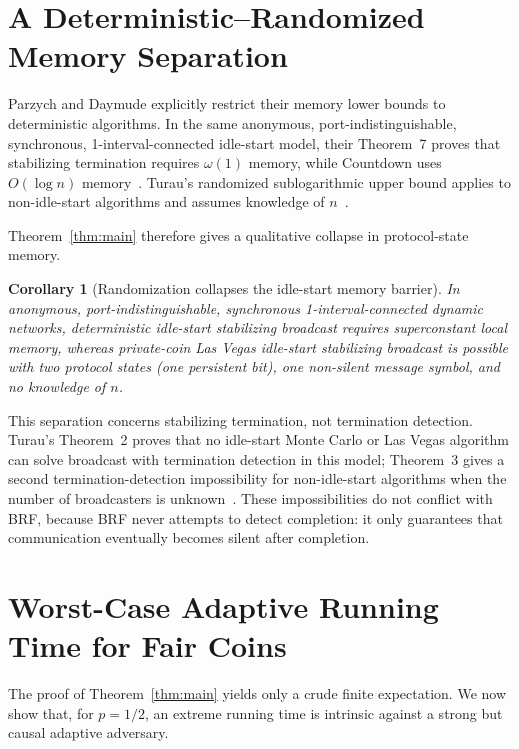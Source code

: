 \documentclass[11pt]{article}
\newtheorem{corollary}[theorem]{Corollary}
\newcommand{\BRF}{\textsc{BRF}}
\begin{document}
\section{A Deterministic--Randomized Memory Separation}

Parzych and Daymude explicitly restrict their memory lower bounds to deterministic algorithms. In the same anonymous, port-indistinguishable, synchronous, 1-interval-connected idle-start model, their Theorem~7 proves that stabilizing termination requires $\omega(1)$ memory, while Countdown uses $O(\log n)$ memory~\cite{ParzychDaymude2024,ParzychDaymude2026}. Turau's randomized sublogarithmic upper bound applies to non-idle-start algorithms and assumes knowledge of $n$~\cite{Turau2026}.

Theorem~\ref{thm:main} therefore gives a qualitative collapse in protocol-state memory.

\begin{corollary}[Randomization collapses the idle-start memory barrier]\label{cor:separation}
In anonymous, port-indistinguishable, synchronous 1-interval-connected dynamic networks, deterministic idle-start stabilizing broadcast requires superconstant local memory, whereas private-coin Las Vegas idle-start stabilizing broadcast is possible with two protocol states (one persistent bit), one non-silent message symbol, and no knowledge of $n$.
\end{corollary}

This separation concerns stabilizing termination, not termination detection. Turau's Theorem~2 proves that no idle-start Monte Carlo or Las Vegas algorithm can solve broadcast with termination detection in this model; Theorem~3 gives a second termination-detection impossibility for non-idle-start algorithms when the number of broadcasters is unknown~\cite{Turau2026}. These impossibilities do not conflict with \BRF{}, because \BRF{} never attempts to detect completion: it only guarantees that communication eventually becomes silent after completion.

\section{Worst-Case Adaptive Running Time for Fair Coins}\label{sec:runtime}

The proof of Theorem~\ref{thm:main} yields only a crude finite expectation. We now show that, for $p=1/2$, an extreme running time is intrinsic against a strong but causal adaptive adversary.
\end{document}
